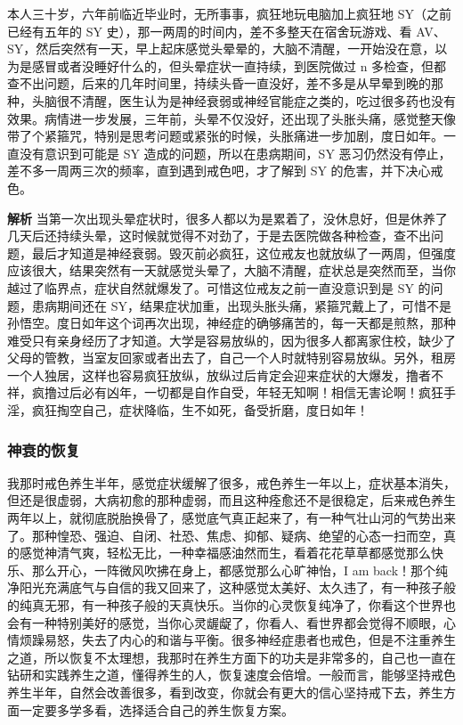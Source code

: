 \begin{case}[神经衰弱]
    本人三十岁，六年前临近毕业时，无所事事，疯狂地玩电脑加上疯狂地 SY（之前已经有五年的 SY 史），那一两周的时间内，差不多整天在宿舍玩游戏、看 AV、SY，然后突然有一天，早上起床感觉头晕晕的，大脑不清醒，一开始没在意，以为是感冒或者没睡好什么的，但头晕症状一直持续，到医院做过 n 多检查，但都查不出问题，后来的几年时间里，持续头昏一直没好，差不多是从早晕到晚的那种，头脑很不清醒，医生认为是神经衰弱或神经官能症之类的，吃过很多药也没有效果。病情进一步发展，三年前，头晕不仅没好，还出现了头胀头痛，感觉整天像带了个紧箍咒，特别是思考问题或紧张的时候，头胀痛进一步加剧，度日如年。一直没有意识到可能是 SY 造成的问题，所以在患病期间，SY 恶习仍然没有停止，差不多一周两三次的频率，直到遇到戒色吧，才了解到 SY 的危害，并下决心戒色。

    \textbf{解析} 当第一次出现头晕症状时，很多人都以为是累着了，没休息好，但是休养了几天后还持续头晕，这时候就觉得不对劲了，于是去医院做各种检查，查不出问题，最后才知道是神经衰弱。毁灭前必疯狂，这位戒友也就放纵了一两周，但强度应该很大，结果突然有一天就感觉头晕了，大脑不清醒，症状总是突然而至，当你越过了临界点，症状自然就爆发了。可惜这位戒友之前一直没意识到是 SY 的问题，患病期间还在 SY，结果症状加重，出现头胀头痛，紧箍咒戴上了，可惜不是孙悟空。度日如年这个词再次出现，神经症的确够痛苦的，每一天都是煎熬，那种难受只有亲身经历了才知道。大学是容易放纵的，因为很多人都离家住校，缺少了父母的管教，当室友回家或者出去了，自己一个人时就特别容易放纵。另外，租房一个人独居，这样也容易疯狂放纵，放纵过后肯定会迎来症状的大爆发，撸者不祥，疯撸过后必有凶年，一切都是自作自受，年轻无知啊！相信无害论啊！疯狂手淫，疯狂掏空自己，症状降临，生不如死，备受折磨，度日如年！
\end{case}

\subsubsection{神衰的恢复}

我那时戒色养生半年，感觉症状缓解了很多，戒色养生一年以上，症状基本消失，但还是很虚弱，大病初愈的那种虚弱，而且这种痊愈还不是很稳定，后来戒色养生两年以上，就彻底脱胎换骨了，感觉底气真正起来了，有一种气壮山河的气势出来了。那种惶恐、强迫、自闭、社恐、焦虑、抑郁、疑病、绝望的心态一扫而空，真的感觉神清气爽，轻松无比，一种幸福感油然而生，看着花花草草都感觉那么快乐、那么开心，一阵微风吹拂在身上，都感觉那么心旷神怡，I am back！那个纯净阳光充满底气与自信的我又回来了，这种感觉太美好、太久违了，有一种孩子般的纯真无邪，有一种孩子般的天真快乐。当你的心灵恢复纯净了，你看这个世界也会有一种特别美好的感觉，当你心灵龌龊了，你看人、看世界都会觉得不顺眼，心情烦躁易怒，失去了内心的和谐与平衡。很多神经症患者也戒色，但是不注重养生之道，所以恢复不太理想，我那时在养生方面下的功夫是非常多的，自己也一直在钻研和实践养生之道，懂得养生的人，恢复速度会倍增。一般而言，能够坚持戒色养生半年，自然会改善很多，看到改变，你就会有更大的信心坚持戒下去，养生方面一定要多学多看，选择适合自己的养生恢复方案。

